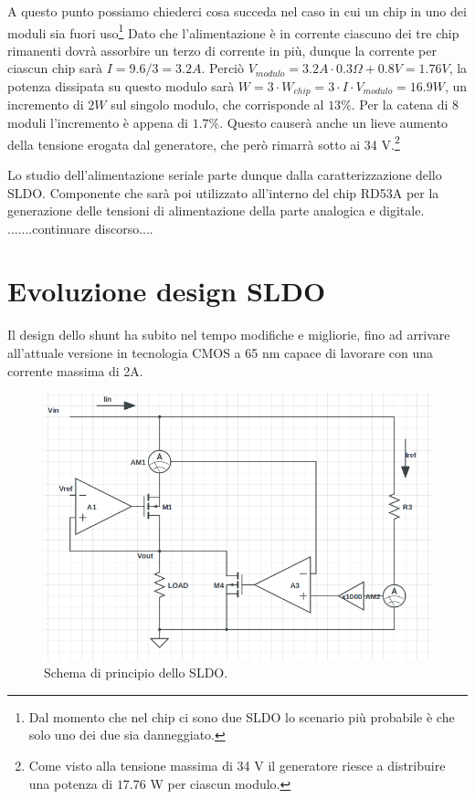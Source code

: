 A questo punto possiamo chiederci cosa succeda nel caso in cui un chip in uno dei moduli sia fuori uso\footnote{Dal momento che nel chip ci sono due SLDO lo scenario più probabile è che solo uno dei due sia danneggiato.} 
Dato che l'alimentazione è in corrente ciascuno dei tre chip rimanenti dovrà assorbire un terzo di corrente in più, dunque la corrente per ciascun chip sarà $ I = 9.6 / 3 = 3.2 A$. 
Perciò $V_{modulo} = 3.2 A \cdot 0.3 \Omega + 0.8 V = 1.76 V$, la potenza dissipata su questo modulo sarà $W = 3 \cdot W_{chip} = 3 \cdot I \cdot V_{modulo} = 16.9 W$, un incremento di $2 W$ sul singolo modulo, che corrisponde al $13 \%$. Per la catena di 8 moduli l'incremento è appena di $1.7\%$. 
Questo causerà anche un lieve aumento della tensione erogata dal generatore, che però rimarrà sotto ai 34 V.\footnote{Come visto alla tensione massima di  34 V il generatore riesce a distribuire una potenza di $17.76$ W per ciascun modulo.} 


Lo studio dell'alimentazione seriale parte dunque dalla caratterizzazione dello SLDO. Componente che sarà poi utilizzato all'interno del chip RD53A per la generazione delle tensioni di alimentazione della parte analogica e digitale. .......continuare discorso....


\section{Evoluzione design SLDO}
Il design dello shunt ha subito nel tempo modifiche e migliorie, fino ad arrivare all'attuale versione in tecnologia CMOS a 65 nm capace di lavorare con una corrente massima di 2A.

\begin{figure}
\centering
\includegraphics[scale=.4]{Immagini/SLDOprova}
\caption{Schema di principio dello SLDO.}
\label{SLDOprova}
\end{figure}


